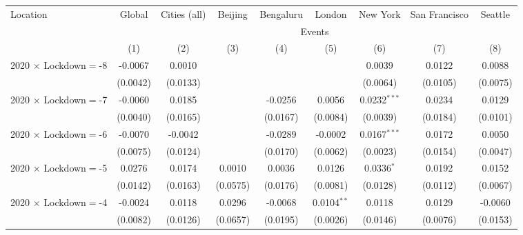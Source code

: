 
\begin{tabular}{lcccccccc}
   \toprule
   Location & Global & Cities (all) & Beijing & Bengaluru & London & New York & San Francisco & Seattle \\ \cmidrule(lr){2-2} \cmidrule(lr){3-3} \cmidrule(lr){4-4} \cmidrule(lr){5-5} \cmidrule(lr){6-6} \cmidrule(lr){7-7} \cmidrule(lr){8-8} \cmidrule(lr){9-9}
    & \multicolumn{8}{c}{Events}\\
                                & (1)            & (2)            & (3)           & (4)            & (5)            & (6)            & (7)            & (8)\\
   \midrule 
   2020 $\times$ Lockdown$=$-8 & -0.0067        & 0.0010         &               &                &                & 0.0039         & 0.0122         & 0.0088\\
                                & (0.0042)       & (0.0133)       &               &                &                & (0.0064)       & (0.0105)       & (0.0075)\\
   2020 $\times$ Lockdown$=$-7 & -0.0060        & 0.0185         &               & -0.0256        & 0.0056         & 0.0232$^{***}$ & 0.0234         & 0.0129\\
                                & (0.0040)       & (0.0165)       &               & (0.0167)       & (0.0084)       & (0.0039)       & (0.0184)       & (0.0101)\\
   2020 $\times$ Lockdown$=$-6 & -0.0070        & -0.0042        &               & -0.0289        & -0.0002        & 0.0167$^{***}$ & 0.0172         & 0.0050\\
                                & (0.0075)       & (0.0124)       &               & (0.0170)       & (0.0062)       & (0.0023)       & (0.0154)       & (0.0047)\\
   2020 $\times$ Lockdown$=$-5 & 0.0276         & 0.0174         & 0.0010        & 0.0036         & 0.0126         & 0.0336$^{*}$   & 0.0192         & 0.0152\\
                                & (0.0142)       & (0.0163)       & (0.0575)      & (0.0176)       & (0.0081)       & (0.0128)       & (0.0112)       & (0.0067)\\
   2020 $\times$ Lockdown$=$-4 & -0.0024        & 0.0118         & 0.0296        & -0.0068        & 0.0104$^{**}$  & 0.0118         & 0.0129         & -0.0060\\
                                & (0.0082)       & (0.0126)       & (0.0657)      & (0.0195)       & (0.0026)       & (0.0146)       & (0.0076)       & (0.0153)\\

\end{tabular}
